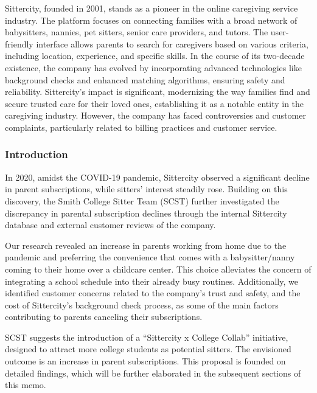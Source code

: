 \documentclass[12pt]{article}
\begin{document}
Sittercity, founded in 2001, stands as a pioneer in the online
caregiving service industry. The platform focuses on connecting families
with a broad network of babysitters, nannies, pet sitters, senior care
providers, and tutors. The user-friendly interface allows parents to
search for caregivers based on various criteria, including location,
experience, and specific skills. In the course of its two-decade
existence, the company has evolved by incorporating advanced
technologies like background checks and enhanced matching algorithms,
ensuring safety and reliability. Sittercity's impact is significant,
modernizing the way families find and secure trusted care for their
loved ones, establishing it as a notable entity in the caregiving
industry. However, the company has faced controversies and customer
complaints, particularly related to billing practices and customer
service.

\hypertarget{introduction-1}{%
\subsubsection{\texorpdfstring{\textbf{Introduction}}{Introduction}}\label{introduction-1}}

In 2020, amidst the COVID-19 pandemic, Sittercity observed a significant
decline in parent subscriptions, while sitters' interest steadily rose.
Building on this discovery, the Smith College Sitter Team (SCST) further
investigated the discrepancy in parental subscription declines through
the internal Sittercity database and external customer reviews of the
company.

Our research revealed an increase in parents working from home due to
the pandemic and preferring the convenience that comes with a
babysitter/nanny coming to their home over a childcare center. This
choice alleviates the concern of integrating a school schedule into
their already busy routines. Additionally, we identified customer
concerns related to the company's trust and safety, and the cost of
Sittercity's background check process, as some of the main factors
contributing to parents canceling their subscriptions.

SCST suggests the introduction of a ``Sittercity x College Collab''
initiative, designed to attract more college students as potential
sitters. The envisioned outcome is an increase in parent subscriptions.
This proposal is founded on detailed findings, which will be further
elaborated in the subsequent sections of this memo.
\end{document}
